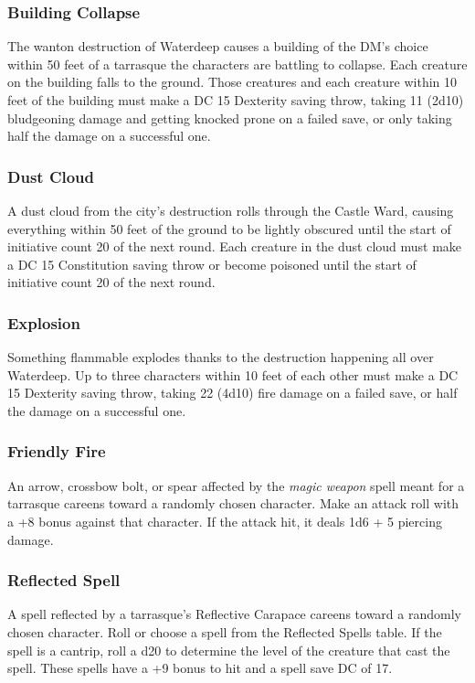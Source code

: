 \documentclass[10pt,a4paper,twoside,bg=print,twocolumn,openany,nodeprecatedcode]{dndbook}
\begin{document}
\subsubsection{Building Collapse}
The wanton destruction of Waterdeep causes a building of the DM's choice within 50 feet of a tarrasque the characters are battling to collapse. Each creature on the building falls to the ground. Those creatures and each creature within 10 feet of the building must make a DC 15 Dexterity saving throw, taking 11 (2d10) bludgeoning damage and getting knocked prone on a failed save, or only taking half the damage on a successful one.

\subsubsection{Dust Cloud}
A dust cloud from the city's destruction rolls through the Castle Ward, causing everything within 50 feet of the ground to be lightly obscured until the start of initiative count 20 of the next round. Each creature in the dust cloud must make a DC 15 Constitution saving throw or become poisoned until the start of initiative count 20 of the next round.

\subsubsection{Explosion}
Something flammable explodes thanks to the destruction happening all over Waterdeep. Up to three characters within 10 feet of each other must make a DC 15 Dexterity saving throw, taking 22 (4d10) fire damage on a failed save, or half the damage on a successful one.

\subsubsection{Friendly Fire}
An arrow, crossbow bolt, or spear affected by the \textit{magic weapon} spell meant for a tarrasque careens toward a randomly chosen character. Make an attack roll with a +8 bonus against that character. If the attack hit, it deals 1d6 + 5 piercing damage.

\subsubsection{Reflected Spell}
A spell reflected by a tarrasque's Reflective Carapace careens toward a randomly chosen character. Roll or choose a spell from the Reflected Spells table. If the spell is a cantrip, roll a d20 to determine the level of the creature that cast the spell. These spells have a +9 bonus to hit and a spell save DC of 17.
\end{document}
